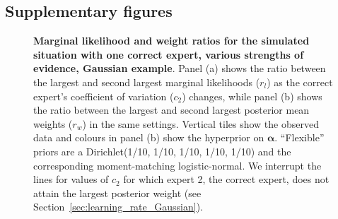 \documentclass[a4paper, notitlepage, 11pt]{article}
\begin{document}
\subsection{Supplementary figures}

\begin{figure}[!ht]
\begin{center}
\end{center}
\caption{\textbf{Marginal likelihood and weight ratios for the simulated situation with one correct expert, various strengths of evidence, Gaussian example}.
Panel (a) shows the ratio between the largest and second largest marginal likelihoods ($r_l$) as the correct expert's coefficient of variation ($c_2$) changes, while panel (b) shows the ratio between the largest and second largest posterior mean weights ($r_w$) in the same settings.
Vertical tiles show the observed data and colours in panel (b) show the hyperprior on $\boldsymbol\alpha$.
``Flexible'' priors are a Dirichlet(1/10, 1/10, 1/10, 1/10, 1/10) and the corresponding moment-matching logistic-normal.
We interrupt the lines for values of $c_2$ for which expert 2, the correct expert, does not attain the largest posterior weight (see Section~\ref{sec:learning_rate_Gaussian}). 
}
\label{fig:one_correct_results_normal}
\end{figure}
\end{document}

